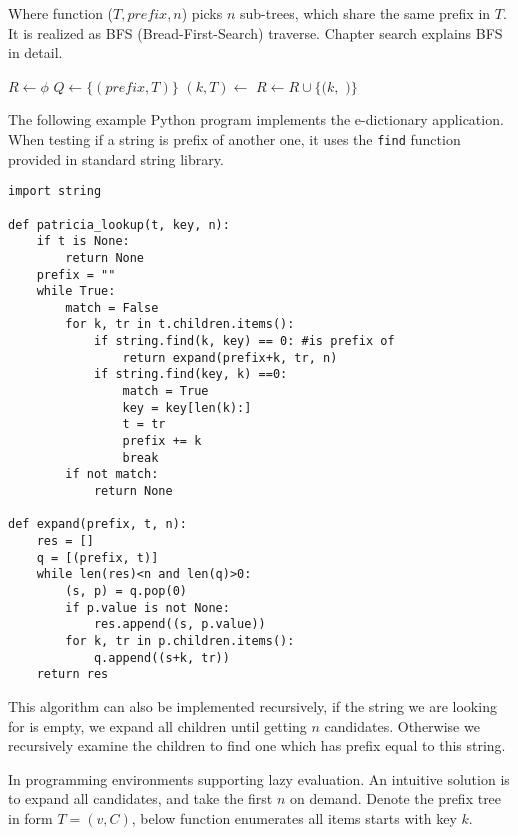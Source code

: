 \documentclass{article}
\begin{document}
Where function ($T, prefix, n$) picks $n$ sub-trees, which
share the same prefix in $T$. It is realized as BFS (Bread-First-Search) traverse. Chapter search
explains BFS in detail.

\begin{algorithmic}[1]
  \State $R \gets \phi$
  \State $Q \gets \{(prefix, T)\}$
    \State $(k, T) \gets$ 
      \State $R \gets R \cup \{(k, $  $)\}$
    \EndIf
      \State {}
    \EndFor
  \EndWhile
\EndFunction
\end{algorithmic}

The following example Python program implements the e-dictionary application.
When testing if a string is prefix of another one, it uses the \texttt{find}
function provided in standard string library.

\lstset{language=Python}
\begin{lstlisting}
import string

def patricia_lookup(t, key, n):
    if t is None:
        return None
    prefix = ""
    while True:
        match = False
        for k, tr in t.children.items():
            if string.find(k, key) == 0: #is prefix of
                return expand(prefix+k, tr, n)
            if string.find(key, k) ==0:
                match = True
                key = key[len(k):]
                t = tr
                prefix += k
                break
        if not match:
            return None

def expand(prefix, t, n):
    res = []
    q = [(prefix, t)]
    while len(res)<n and len(q)>0:
        (s, p) = q.pop(0)
        if p.value is not None:
            res.append((s, p.value))
        for k, tr in p.children.items():
            q.append((s+k, tr))
    return res
\end{lstlisting}

This algorithm can also be implemented recursively, if the string we
are looking for is empty, we expand all children until getting $n$
candidates. Otherwise we recursively examine the children to
find one which has prefix equal to this string.

In programming environments supporting lazy evaluation. An intuitive
solution is to expand all candidates, and take the first $n$ on
demand. Denote the prefix tree in form $T = (v, C)$,
below function enumerates all items starts with key $k$.
\end{document}
